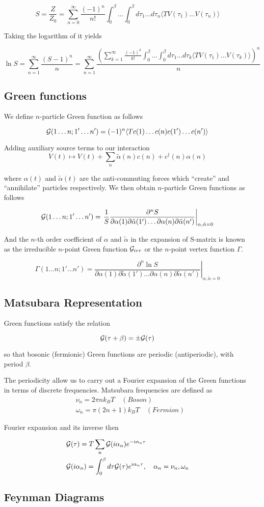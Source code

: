 \[ S = \frac{Z}{Z_0} = \sum_{n=0}^{\infty}\frac{(-1)^n}{n!}\int_{0}^{\beta}\dots\int_{0}^{\beta} d\tau_1\dots d\tau_n 
    \langle T V(\tau_1)\dots V(\tau_n) \rangle \]

Taking the logarithm of it yields

\[ \ln{S} = \sum_{n=1}^{\infty}\frac{(S-1)^n}{n} = \sum_{n=1}^{\infty}
  \frac{(\sum_{k=1}^{\infty}\frac{(-1)^k}{k!}\int_{0}^{\beta}\dots\int_{0}^{\beta} d\tau_1\dots d\tau_k 
    \langle T V(\tau_1)\dots V(\tau_k) \rangle)^n}{n} \]

\subsection{Green functions}
We define $n$-particle Green function as follows

\[ \mathcal{G}(1\dots n;1'\dots n') = (-1)^n\langle T c(1)\dots c(n)c(1')\dots c(n')\rangle \]

Adding auxiliary source terms to our interaction
\[ V(t) \mapsto V(t) + \sum_n \tilde{\alpha}(n)c(n)+c^\dagger(n) \alpha(n) \] 

where $\alpha(t)$ and $\tilde{\alpha}(t)$ are the anti-commuting forces which ``create'' and ``annihilate'' particles respectively.
We then obtain $n$-particle Green functions as follows

\[ \mathcal{G}(1\dots n;1'\dots n') = \left.\frac{1}{S}\frac{\partial^n S}{\partial\alpha(1)\partial\tilde{\alpha}(1')\dots \partial\alpha(n)\partial\tilde{\alpha}(n')}\right|_{\alpha,\tilde{\alpha}=0} \]

And the $n$-th order coefficient of $\alpha$ and $\tilde{\alpha}$ in the expansion of S-matrix
is known as the irreducible $n$-point Green function $\mathcal{G}_{irr}$ or the $n$-point vertex function $\Gamma$.

\[ \Gamma(1\dots n;1'\dots n') = \left.\frac{\partial^n \ln{S}}{\partial\alpha(1)\partial\tilde{\alpha}(1')\dots \partial\alpha(n)\partial\tilde{\alpha}(n')}\right|_{\alpha,\tilde{\alpha}=0} \]

\subsection{Matsubara Representation}
Green functions satisfy the relation

\[ \mathcal{G}(\tau+\beta) = \pm \mathcal{G}(\tau) \]

so that bosonic (fermionic) Green functions are periodic (antiperiodic), with period $\beta$.

The periodicity allow us to carry out a Fourier expansion of the Green functions in terms of discrete frequencies.
Matsubara frequencies are defined as
\begin{align*}
  & \nu_n = 2\pi n k_B T \quad (Boson) \\ 
  & \omega_n = \pi(2n+1)k_B T \quad (Fermion)
\end{align*}

Fourier expansion and its inverse then

\begin{align*}
  & \mathcal{G}(\tau) = T\sum_n \mathcal{G}(i\alpha_n)e^{-i\alpha_n\tau} \\
  & \mathcal{G}(i\alpha_n) = \int_0^\beta d\tau \mathcal{G}(\tau) e^{i\alpha_n\tau} ,\quad \alpha_n = \nu_n, \omega_n
\end{align*}

\subsection{Feynman Diagrams}

